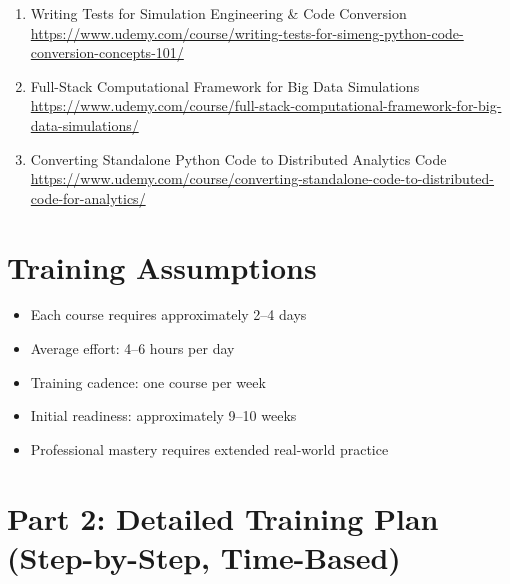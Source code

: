 \documentclass[12pt]{article}
\begin{document}
\begin{enumerate}[label=\textbf{Course \arabic*:}]
		\item Writing Tests for Simulation Engineering \& Code Conversion \\
		\href{https://www.udemy.com/course/writing-tests-for-simeng-python-code-conversion-concepts-101/}
		{https://www.udemy.com/course/writing-tests-for-simeng-python-code-conversion-concepts-101/}
		
		\item Full-Stack Computational Framework for Big Data Simulations \\
		\href{https://www.udemy.com/course/full-stack-computational-framework-for-big-data-simulations/}
		{https://www.udemy.com/course/full-stack-computational-framework-for-big-data-simulations/}
		
		\item Converting Standalone Python Code to Distributed Analytics Code \\
		\href{https://www.udemy.com/course/converting-standalone-code-to-distributed-code-for-analytics/}
		{https://www.udemy.com/course/converting-standalone-code-to-distributed-code-for-analytics/}
	\end{enumerate}
	
	\section*{Training Assumptions}
	
	\begin{itemize}
		\item Each course requires approximately 2–4 days
		\item Average effort: 4–6 hours per day
		\item Training cadence: one course per week
		\item Initial readiness: approximately 9–10 weeks
		\item Professional mastery requires extended real-world practice
	\end{itemize}
	
	\newpage
	
	\section*{Part 2: Detailed Training Plan (Step-by-Step, Time-Based)}
	
\end{document}
